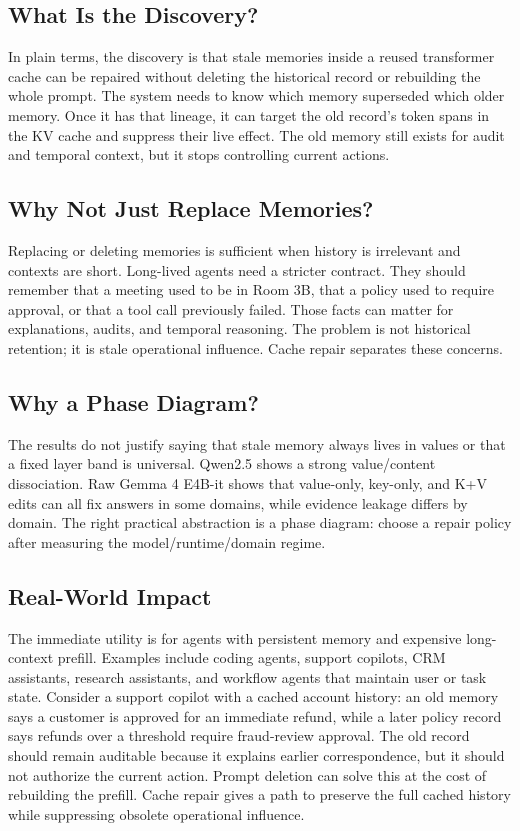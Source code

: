 \documentclass[11pt]{article}
\newcommand{\gemma}{Gemma 4 E4B-it}
\begin{document}
\subsection{What Is the Discovery?}

In plain terms, the discovery is that stale memories inside a reused
transformer cache can be repaired without deleting the historical record or
rebuilding the whole prompt. The system needs to know which memory superseded
which older memory. Once it has that lineage, it can target the old record's
token spans in the KV cache and suppress their live effect. The old memory
still exists for audit and temporal context, but it stops controlling current
actions.

\subsection{Why Not Just Replace Memories?}

Replacing or deleting memories is sufficient when history is irrelevant and
contexts are short. Long-lived agents need a stricter contract. They should
remember that a meeting used to be in Room 3B, that a policy used to require
approval, or that a tool call previously failed. Those facts can matter for
explanations, audits, and temporal reasoning. The problem is not historical
retention; it is stale operational influence. Cache repair separates these
concerns.

\subsection{Why a Phase Diagram?}

The results do not justify saying that stale memory always lives in values or
that a fixed layer band is universal. Qwen2.5 shows a strong value/content
dissociation. Raw \gemma{} shows that value-only, key-only, and K+V edits can
all fix answers in some domains, while evidence leakage differs by domain.
The right practical abstraction is a phase diagram: choose a repair policy
after measuring the model/runtime/domain regime.

\subsection{Real-World Impact}

The immediate utility is for agents with persistent memory and expensive
long-context prefill. Examples include coding agents, support copilots, CRM
assistants, research assistants, and workflow agents that maintain user or task
state. Consider a support copilot with a cached account history: an old memory
says a customer is approved for an immediate refund, while a later policy
record says refunds over a threshold require fraud-review approval. The old
record should remain auditable because it explains earlier correspondence, but
it should not authorize the current action. Prompt deletion can solve this at
the cost of rebuilding the prefill. Cache repair gives a path to preserve the
full cached history while suppressing obsolete operational influence.
\end{document}
